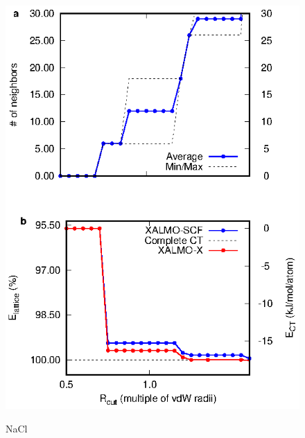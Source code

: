 \documentclass[aps,prb,twocolumn,amsmath,amssymb,superscriptaddress,longbibliography]{revtex4-1}
\begin{document}
\begin{figure}
\includegraphics[scale=1]{./plots/NaCl_EvR}
\label{nacl}
\caption{NaCl}
\end{figure}
\end{document}
